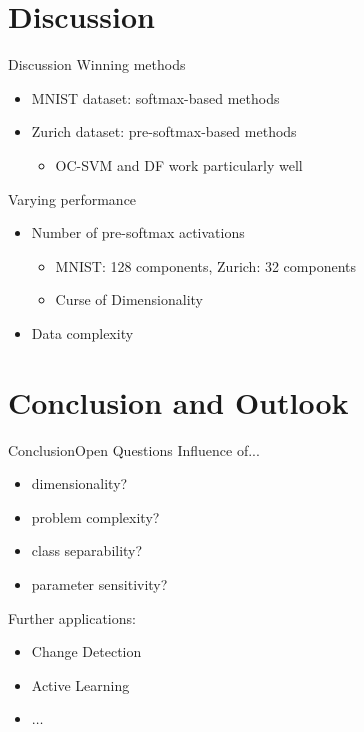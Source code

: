 \documentclass[xcolor={usenames,dvipsnames}]{beamer}
\begin{document}
\section{Discussion}
\begin{frame}{Discussion}
Winning methods
	\begin{itemize}
		\item \gls{MNIST} dataset: softmax-based methods
		\item Zurich dataset: pre-softmax-based methods
		\begin{itemize}
			\item \gls{OC-SVM} and \acrlong{DF} work particularly well
		\end{itemize}
	\end{itemize}\pause
	Varying performance
	\begin{itemize}
		\item Number of pre-softmax activations
		\begin{itemize}
			\item \gls{MNIST}: 128 components, Zurich: 32 components
			\item Curse of Dimensionality
		\end{itemize}
		\item Data complexity
	\end{itemize}
\end{frame}






\section{Conclusion and Outlook}

\begin{frame}{Conclusion}{Open Questions}
	Influence of...
	\begin{itemize}
		\item dimensionality?
		\item problem complexity?
		\item class separability?
		\item parameter sensitivity?
	\end{itemize}\pause
	Further applications:
	\begin{itemize}
		\item Change Detection
		\item Active Learning
		\item $\dots$
	\end{itemize}
\end{frame}
\end{document}
